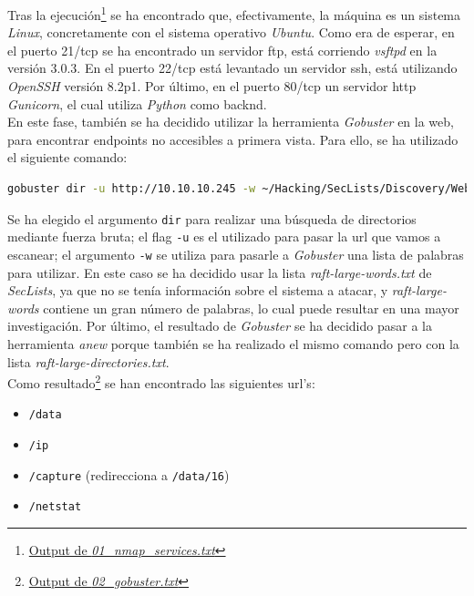 Tras la ejecución\footnote{\href{https://github.com/VictorNS69/TFM/blob/main/machines/cap/01_nmap_services.txt}{Output de \textit{01\_nmap\_services.txt}}} se ha encontrado que, efectivamente, la máquina es un sistema \textit{Linux}, concretamente con el sistema operativo \textit{Ubuntu}. Como era de esperar, en el puerto 21/\acrshort{tcp} se ha encontrado un servidor \acrshort{ftp}, está corriendo \textit{vsftpd}\cite{vsftpd} en la versión 3.0.3. En el puerto 22/\acrshort{tcp} está levantado un servidor \acrshort{ssh}, está utilizando \textit{OpenSSH}\cite{openssh} versión 8.2p1. Por último, en el puerto 80/\acrshort{tcp} un servidor \acrshort{http} \textit{Gunicorn}\cite{gunicorn}, el cual utiliza \textit{Python} como backnd.\\

En este fase, también se ha decidido utilizar la herramienta \textit{Gobuster}\cite{gobuster} en la web, para encontrar endpoints no accesibles a primera vista. Para ello, se ha utilizado el siguiente comando:
\begin{lstlisting}[language=bash]
gobuster dir -u http://10.10.10.245 -w ~/Hacking/SecLists/Discovery/Web-Content/raft-large-words.txt | anew 03_gobuster.txt
\end{lstlisting}
Se ha elegido el argumento \texttt{dir} para realizar una búsqueda de directorios mediante fuerza bruta; el flag \texttt{-u} es el utilizado para pasar la \acrshort{url} que vamos  a escanear; el argumento \texttt{-w} se utiliza para pasarle a \textit{Gobuster} una lista de palabras para utilizar. En este caso se ha decidido usar la lista \textit{raft-large-words.txt} de \textit{SecLists}\cite{seclists}, ya que no se tenía información sobre el sistema a atacar, y \textit{raft-large-words} contiene un gran número de palabras, lo cual puede resultar en una mayor investigación. Por último, el resultado de \textit{Gobuster} se ha decidido pasar a la herramienta \textit{anew}\cite{anew} porque también se ha realizado el mismo comando pero con la lista \textit{raft-large-directories.txt}.\\

Como resultado\footnote{\href{https://github.com/VictorNS69/TFM/blob/main/machines/cap/02_gobuster.txt}{Output de \textit{02\_gobuster.txt}}} se han encontrado las siguientes \acrshort{url}'s:
\begin{itemize}
    \item \texttt{/data}
    \item \texttt{/ip}
    \item \texttt{/capture} (redirecciona a \texttt{/data/16})
    \item \texttt{/netstat}
\end{itemize}


